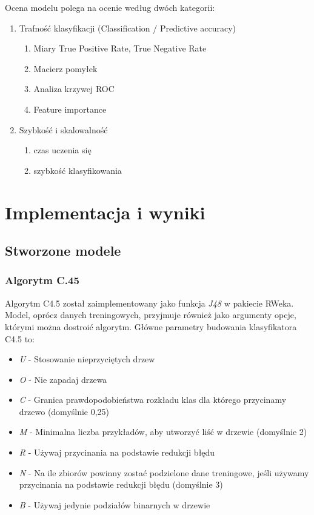 \documentclass[11pt]{article} %
\begin{document}
Ocena modelu polega na ocenie według dwóch kategorii:
\begin{enumerate}
\item Trafność klasyfikacji (Classification / Predictive accuracy)
	\begin{enumerate}
	\item Miary True Positive Rate, True Negative Rate
	\item Macierz pomyłek
	\item Analiza krzywej ROC
	\item Feature importance
	\end{enumerate}
\item Szybkość i skalowalność
	\begin{enumerate}
	\item czas uczenia się
	\item szybkość klasyfikowania
	\end{enumerate}
\end{enumerate}

\section{Implementacja i wyniki}

\subsection{Stworzone modele}

\subsubsection{Algorytm C.45}

Algorytm C4.5 został zaimplementowany jako funkcja \emph{J48}  w pakiecie RWeka. Model, oprócz danych treningowych, przyjmuje również jako argumenty opcje, którymi można dostroić algorytm. Główne parametry budowania klasyfikatora C4.5 to:
\begin{itemize}
\item \emph{U} - Stosowanie nieprzyciętych drzew
\item \emph{O} - Nie zapadaj drzewa
\item \emph{C} - Granica prawdopodobieństwa rozkładu klas dla którego przycinamy drzewo (domyślnie 0,25)
\item \emph{M} - Minimalna liczba przykładów, aby utworzyć liść w drzewie (domyślnie 2)
\item \emph{R} - Używaj przycinania na podstawie redukcji błędu
\item \emph{N} - Na ile zbiorów powinny zostać podzielone dane treningowe, jeśli używamy przycinania na podstawie redukcji błędu (domyślnie 3)
\item \emph{B} - Używaj jedynie podziałów binarnych w drzewie
\end{itemize}
\end{document}
